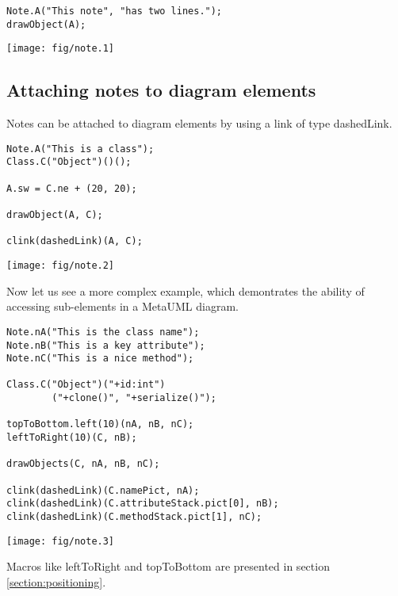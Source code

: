 \documentclass{article}
\newcommand{\code}{\ttfamily}
\begin{document}
\begin{multicols}{2}
\begin{verbatim}
Note.A("This note", "has two lines.");
drawObject(A);
\end{verbatim}
\columnbreak
\hspace{3cm}\texttt{[image: fig/note.1]}
\end{multicols}

\subsection{Attaching notes to diagram elements}

Notes can be attached to diagram elements by using a link of type {\code dashedLink}.

\begin{multicols}{2}
\begin{verbatim}
Note.A("This is a class");
Class.C("Object")()();

A.sw = C.ne + (20, 20);

drawObject(A, C);

clink(dashedLink)(A, C);
\end{verbatim}
\columnbreak
\hspace{1cm}\texttt{[image: fig/note.2]}
\end{multicols}

Now let us see a more complex example, which demontrates the ability of accessing sub-elements in a MetaUML diagram.
\pagebreak

\begin{multicols}{2}
\begin{verbatim}
Note.nA("This is the class name");
Note.nB("This is a key attribute");
Note.nC("This is a nice method");

Class.C("Object")("+id:int")
        ("+clone()", "+serialize()");

topToBottom.left(10)(nA, nB, nC);
leftToRight(10)(C, nB);

drawObjects(C, nA, nB, nC);

clink(dashedLink)(C.namePict, nA); 
clink(dashedLink)(C.attributeStack.pict[0], nB); 
clink(dashedLink)(C.methodStack.pict[1], nC);
\end{verbatim}
\columnbreak
\hspace{1cm}\texttt{[image: fig/note.3]}
\end{multicols}

Macros like {\code leftToRight} and {\code topToBottom} are presented in section \ref{section:positioning}.
\end{document}
